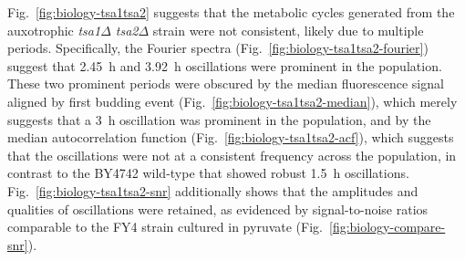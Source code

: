 Fig.\ \ref{fig:biology-tsa1tsa2} suggests that the metabolic cycles generated from the auxotrophic \textit{tsa1$\Delta$ tsa2$\Delta$} strain were not consistent, likely due to multiple periods.
Specifically, the Fourier spectra (Fig.\ \ref{fig:biology-tsa1tsa2-fourier}) suggest that \SI{2.45}{\hour} and \SI{3.92}{\hour} oscillations were prominent in the population.
These two prominent periods were obscured by the median fluorescence signal aligned by first budding event (Fig.\ \ref{fig:biology-tsa1tsa2-median}), which merely suggests that a \SI{3}{\hour} oscillation was prominent in the population, and by the median autocorrelation function (Fig.\ \ref{fig:biology-tsa1tsa2-acf}), which suggests that the oscillations were not at a consistent frequency across the population, in contrast to the BY4742 wild-type that showed robust \SI{1.5}{\hour} oscillations.
Fig.\ \ref{fig:biology-tsa1tsa2-snr} additionally shows that the amplitudes and qualities of oscillations were retained, as evidenced by signal-to-noise ratios comparable to the FY4 strain cultured in pyruvate (Fig.\ \ref{fig:biology-compare-snr}).%

